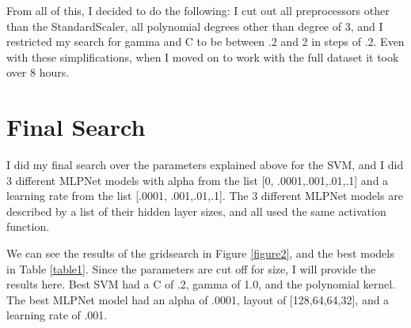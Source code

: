 \documentclass[12pt]{article}
\begin{document}
From all of this, I decided to do the following: I cut out all preprocessors other than the StandardScaler, all polynomial 
degrees other than degree of 3, and I restricted my search for gamma and C to be between .2 and 2 in steps of .2. Even with 
these simplifications, when I moved on to work with the full dataset it took over 8 hours. 

\section{Final Search}
I did my final search over the parameters explained above for the SVM, and I did 3 different MLPNet models with alpha from 
the list [0, .0001,.001,.01,.1] and a learning rate from the list [.0001, .001,.01,.1]. The 3 different MLPNet models are 
described by a list of their hidden layer sizes, and all used the same activation function. 

We can see the results of the gridsearch in Figure \ref{figure2}, and the best models in Table \ref{table1}. Since the 
parameters are cut off for size, I will provide the results here. Best SVM had a C of .2, gamma of 1.0, and the polynomial 
kernel. The best MLPNet model had an alpha of .0001, layout of [128,64,64,32], and a learning rate of .001.
\end{document}
